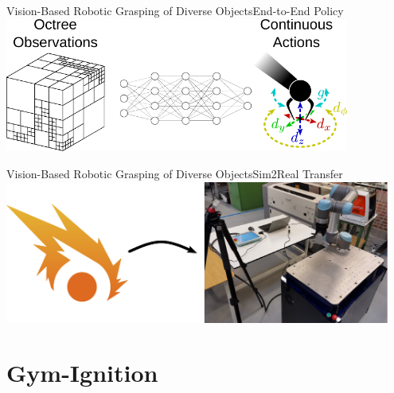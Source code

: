 \begin{frame}{Vision-Based Robotic Grasping of Diverse Objects}{End-to-End Policy}
    \centering
    \includegraphics[width=0.85\textwidth]{graphics/end_to_end_policy.pdf}
\end{frame}

\begin{frame}{Vision-Based Robotic Grasping of Diverse Objects}{Sim2Real Transfer}
    \centering
    \includegraphics[width=0.95\textwidth]{graphics/sim2real.pdf}
\end{frame}


\section{Gym-Ignition}

